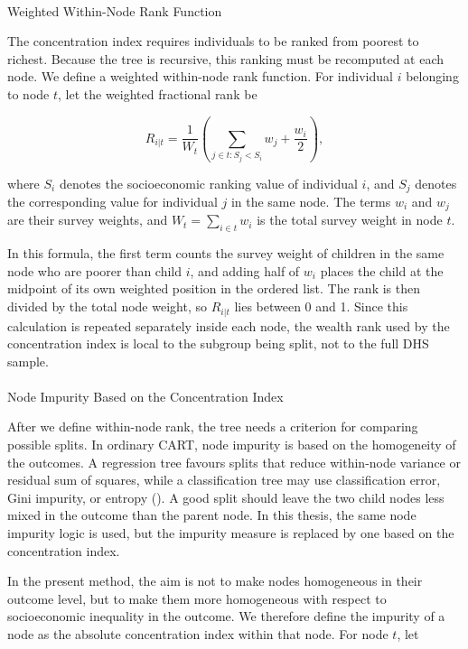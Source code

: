 \documentclass[
  11pt,
  a4paper,
]{article}
\makeatletter
\let\oldparagraph\paragraph
\renewcommand{\paragraph}{
    \@ifstar
      \xxxParagraphStar
      \xxxParagraphNoStar
  }
\newcommand{\xxxParagraphStar}[1]{\oldparagraph*{#1}\mbox{}}
\newcommand{\xxxParagraphNoStar}[1]{\oldparagraph{#1}\mbox{}}
\makeatother
\begin{document}
\paragraph{Weighted Within-Node Rank
Function}\label{sec-weighted-within-node-rank}

The concentration index requires individuals to be ranked from poorest
to richest. Because the tree is recursive, this ranking must be
recomputed at each node. We define a weighted within-node rank function.
For individual \(i\) belonging to node \(t\), let the weighted
fractional rank be

\[
R_{i|t}
=
\frac{1}{W_t}
\left(
\sum_{j \in t: S_j < S_i} w_j + \frac{w_i}{2}
\right),
\]

where \(S_i\) denotes the socioeconomic ranking value of individual
\(i\), and \(S_j\) denotes the corresponding value for individual \(j\)
in the same node. The terms \(w_i\) and \(w_j\) are their survey
weights, and \(W_t = \sum_{i \in t} w_i\) is the total survey weight in
node \(t\).

In this formula, the first term counts the survey weight of children in
the same node who are poorer than child \(i\), and adding half of
\(w_i\) places the child at the midpoint of its own weighted position in
the ordered list. The rank is then divided by the total node weight, so
\(R_{i|t}\) lies between 0 and 1. Since this calculation is repeated
separately inside each node, the wealth rank used by the concentration
index is local to the subgroup being split, not to the full DHS sample.

\paragraph{Node Impurity Based on the Concentration
Index}\label{sec-node-impurity-ci}

After we define within-node rank, the tree needs a criterion for
comparing possible splits. In ordinary CART, node impurity is based on
the homogeneity of the outcomes. A regression tree favours splits that
reduce within-node variance or residual sum of squares, while a
classification tree may use classification error, Gini impurity, or
entropy (). A good split should leave the two child nodes less
mixed in the outcome than the parent node. In this thesis, the same node
impurity logic is used, but the impurity measure is replaced by one
based on the concentration index.

In the present method, the aim is not to make nodes homogeneous in their
outcome level, but to make them more homogeneous with respect to
socioeconomic inequality in the outcome. We therefore define the
impurity of a node as the absolute concentration index within that node.
For node \(t\), let
\end{document}
